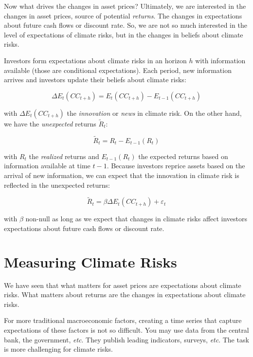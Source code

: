 Now what drives the changes in asset prices?
Ultimately, we are interested in the changes in asset prices,
source of potential \textit{returns}.
The changes in expectations about 
future cash flows or discount rate. 
So,
we are not so much interested in the level of
expectations of climate risks, but in the changes
in beliefs about climate risks.

Investors form expectations about climate risks
in an horizon $h$ with information available (those 
are conditional expectations).
Each period, new information arrives and investors
update their beliefs about climate risks:

\begin{equation}
    \Delta E_t (CC_{t+h}) = E_t(CC_{t+h}) - E_{t-1}(CC_{t+h})
\end{equation}

with $\Delta E_t (CC_{t+h})$ the \textit{innovation} or 
\textit{news} in climate risk. On the other hand, we have the \textit{unexpected} returns $\tilde{R}_t$:

\begin{equation}
    \tilde{R}_t = R_t - E_{t-1}(R_t)
\end{equation}

with $R_t$ the \textit{realized} returns 
and $E_{t-1}(R_t)$ the expected returns based on information available at time $t-1$.
Because investors reprice assets based on the arrival of new information,
we can expect that the innovation in climate risk is reflected in the unexpected returns:

\begin{equation}
    \tilde{R}_t = \beta \Delta E_t(CC_{t+h}) + \varepsilon_t
\end{equation}


with $\beta$ non-null as long as we expect 
that changes in climate risks affect investors 
expectations about future cash flows or discount rate.


\section{Measuring Climate Risks}

We have seen that what matters for asset prices
are expectations about climate risks. What 
matters about returns are the changes in
expectations about climate risks.

For more traditional macroeconomic factors, 
creating a time series that capture expectations 
of these factors is not so difficult. You may 
use data from the central bank, the government,
\textit{etc}. They publish leading indicators,
surveys, \textit{etc}. The task is more 
challenging for climate risks.

